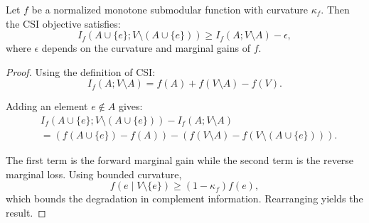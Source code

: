 \documentclass[10pt,a4paper]{amsart}
\begin{document}
\begin{proposition}
Let $f$ be a normalized monotone submodular function with curvature $\kappa_f$. Then the CSI objective satisfies:
\[
I_f(A\cup\{e\};V\setminus(A\cup\{e\}))
\ge
I_f(A;V\setminus A)-\epsilon,
\]
where $\epsilon$ depends on the curvature and marginal gains of $f$.
\end{proposition}

\begin{proof}
Using the definition of CSI:
\[
I_f(A;V\setminus A)
=
f(A)+f(V\setminus A)-f(V).
\]

Adding an element $e\notin A$ gives:
\begin{align}
&
I_f(A\cup\{e\};V\setminus(A\cup\{e\}))
-
I_f(A;V\setminus A)
\nonumber \\
&=
\left(
f(A\cup\{e\})-f(A)
\right)
-
\left(
f(V\setminus A)-f(V\setminus(A\cup\{e\}))
\right).
\end{align}

The first term is the forward marginal gain while the second term is the reverse marginal loss. Using bounded curvature,
\[
f(e\mid V\setminus\{e\})
\ge
(1-\kappa_f)f(e),
\]
which bounds the degradation in complement information. Rearranging yields the result.
\end{proof}
\end{document}

